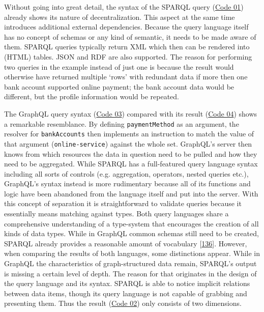 \documentclass[12pt,english,a4paper,titlepage,cleardoublepage=empty,dottedtoc]{report}
\begin{document}
Without going into great detail, the syntax of the SPARQL query
(\protect\hyperlink{code-01_sparql-query}{Code 01}) already shows its
nature of decentralization. This aspect at the same time introduces
additional external dependencies. Because the query language itself has
no concept of schemas or any kind of semantic, it needs to be made aware
of them. SPARQL queries typically return XML which then can be rendered
into (HTML) tables. JSON and RDF are also supported. The reason for
performing two queries in the example instead of just one is because the
result would otherwise have returned multiple `rows' with redundant data
if more then one bank account supported online payment; the bank account
data would be different, but the profile information would be repeated.

The GraphQL query syntax (\protect\hyperlink{code-03_graphql-query}{Code
03}) compared with its result
(\protect\hyperlink{code-04_graphql-query-result}{Code 04}) shows a
remarkable resemblance. By defining \texttt{paymentMethod} as an
argument, the resolver for \texttt{bankAccounts} then implements an
instruction to match the value of that argument
(\texttt{\textquotesingle{}online-service\textquotesingle{}}) against
the whole set. GraphQL's server then knows from which resources the data
in question need to be pulled and how they need to be aggregated. While
SPARQL has a full-featured query language syntax including all sorts of
controls (e.g. aggregation, operators, nested queries etc.), GraphQL's
syntax instead is more rudimentary because all of its functions and
logic have been abandoned from the language itself and put into the
server. With this concept of separation it is straightforward to
validate queries because it essentially means matching against types.
Both query languages share a comprehensive understanding of a
type-system that encourages the creation of all kinds of data types.
While in GraphQL common schemas still need to be created, SPARQL already
provides a reasonable amount of vocabulary
{[}\protect\hyperlink{ref-web_w3c-tr_rdf-schemas}{136}{]}. However, when
comparing the results of both languages, some distinctions appear. While
in GraphQL the characteristics of graph-structured data remain, SPARQL's
output is missing a certain level of depth. The reason for that
originates in the design of the query language and its syntax. SPARQL is
able to notice implicit relations between data items, though its query
language is not capable of grabbing and presenting them. Thus the result
(\protect\hyperlink{code-02_sparql-query-results}{Code 02}) only
consists of two dimensions.
\end{document}
